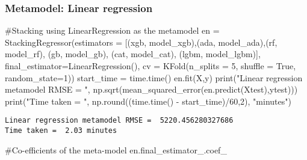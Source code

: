 \documentclass[
  letterpaper,
  DIV=11,
  numbers=noendperiod]{scrreprt}
\newenvironment{Shaded}{\begin{snugshade}}{\end{snugshade}}
\newcommand{\BuiltInTok}[1]{\textcolor[rgb]{0.00,0.23,0.31}{#1}}
\newcommand{\CommentTok}[1]{\textcolor[rgb]{0.37,0.37,0.37}{#1}}
\newcommand{\DecValTok}[1]{\textcolor[rgb]{0.68,0.00,0.00}{#1}}
\newcommand{\NormalTok}[1]{\textcolor[rgb]{0.00,0.23,0.31}{#1}}
\newcommand{\OperatorTok}[1]{\textcolor[rgb]{0.37,0.37,0.37}{#1}}
\newcommand{\StringTok}[1]{\textcolor[rgb]{0.13,0.47,0.30}{#1}}
\newcommand{\VariableTok}[1]{\textcolor[rgb]{0.07,0.07,0.07}{#1}}
\begin{document}
\subsubsection{Metamodel: Linear
regression}\label{metamodel-linear-regression}

\begin{Shaded}
\begin{Highlighting}[]
\CommentTok{\#Stacking using LinearRegression as the metamodel}
\NormalTok{en }\OperatorTok{=}\NormalTok{ StackingRegressor(estimators }\OperatorTok{=}\NormalTok{ [(}\StringTok{\textquotesingle{}xgb\textquotesingle{}}\NormalTok{, model\_xgb),(}\StringTok{\textquotesingle{}ada\textquotesingle{}}\NormalTok{, model\_ada),(}\StringTok{\textquotesingle{}rf\textquotesingle{}}\NormalTok{, model\_rf),}
\NormalTok{                                     (}\StringTok{\textquotesingle{}gb\textquotesingle{}}\NormalTok{, model\_gb), (}\StringTok{\textquotesingle{}cat\textquotesingle{}}\NormalTok{, model\_cat), (}\StringTok{\textquotesingle{}lgbm\textquotesingle{}}\NormalTok{, model\_lgbm)],}
\NormalTok{                     final\_estimator}\OperatorTok{=}\NormalTok{LinearRegression(),                                          }
\NormalTok{                    cv }\OperatorTok{=}\NormalTok{ KFold(n\_splits }\OperatorTok{=} \DecValTok{5}\NormalTok{, shuffle }\OperatorTok{=} \VariableTok{True}\NormalTok{, random\_state}\OperatorTok{=}\DecValTok{1}\NormalTok{))}
\NormalTok{start\_time }\OperatorTok{=}\NormalTok{ time.time()}
\NormalTok{en.fit(X,y)}
\BuiltInTok{print}\NormalTok{(}\StringTok{"Linear regression metamodel RMSE = "}\NormalTok{, np.sqrt(mean\_squared\_error(en.predict(Xtest),ytest)))}
\BuiltInTok{print}\NormalTok{(}\StringTok{"Time taken = "}\NormalTok{, np.}\BuiltInTok{round}\NormalTok{((time.time() }\OperatorTok{{-}}\NormalTok{ start\_time)}\OperatorTok{/}\DecValTok{60}\NormalTok{,}\DecValTok{2}\NormalTok{), }\StringTok{"minutes"}\NormalTok{)}
\end{Highlighting}
\end{Shaded}

\begin{verbatim}
Linear regression metamodel RMSE =  5220.456280327686
Time taken =  2.03 minutes
\end{verbatim}

\begin{Shaded}
\begin{Highlighting}[]
\CommentTok{\#Co{-}efficients of the meta{-}model}
\NormalTok{en.final\_estimator\_.coef\_}
\end{Highlighting}
\end{Shaded}
\end{document}
